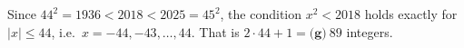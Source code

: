 Since $44^2=1936<2018<2025=45^2$, the condition $x^2<2018$ holds exactly for $|x|\le44$, i.e.\ $x=-44,-43,\dots,44$. That is $2\cdot44+1=\boxed{\textbf{(g)}\ 89}$ integers.
